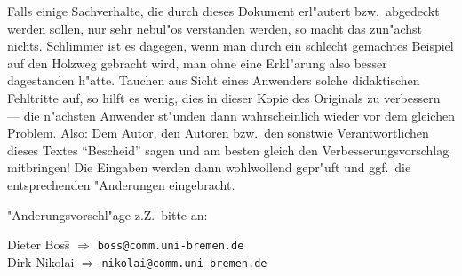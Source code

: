 Falls einige Sachverhalte, die durch dieses Dokument erl"autert bzw.\
abgedeckt werden sollen, nur sehr nebul"os verstanden werden, so macht
das zun"achst nichts. Schlimmer ist es dagegen, wenn man durch ein
schlecht gemachtes Beispiel auf den Holzweg gebracht wird, man ohne
eine Erkl"arung also besser dagestanden h"atte. Tauchen aus Sicht eines
Anwenders solche didaktischen Fehltritte auf, so hilft es wenig, dies
in dieser Kopie des Originals zu verbessern --- die n"achsten Anwender
st"unden dann wahrscheinlich wieder vor dem gleichen Problem. Also: Dem
Autor, den Autoren bzw.\ den sonstwie Verantwortlichen dieses Textes
``Bescheid'' sagen und am besten gleich den Verbesserungsvorschlag
mitbringen! Die Eingaben werden dann wohlwollend gepr"uft und ggf.\ die
entsprechenden "Anderungen eingebracht.

"Anderungsvorschl"age z.Z.\ bitte an:
\vspace*{-1em}
\begin{tabbing}
  Dieter Boss\quad  \= $\Rightarrow$ \= {\tt boss@comm.uni-bremen.de} \\
  Dirk Nikolai      \> $\Rightarrow$ \> {\tt nikolai@comm.uni-bremen.de} 
\end{tabbing}



